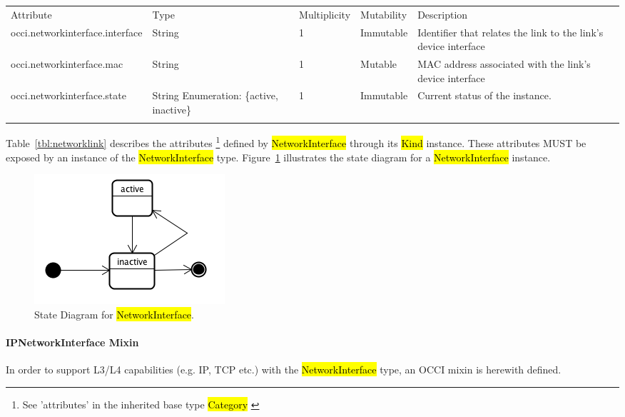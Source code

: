 \documentclass[10pt,a4paper]{article}
\begin{document}
{
	\begin{tabular}{lp{2.5cm}p{1cm}lp{6cm}}
	\toprule
	Attribute&Type&Multi\-plicity&Mutability&Description\\
	\colrule
	occi.networkinterface.interface & String & 1 & Immutable 
	& Identifier that relates the link to the link's device interface\\
	occi.networkinterface.mac & String & 1 & Mutable 
	& MAC address associated with the link's device interface\\
	occi.networkinterface.state & String Enumeration: \{active, inactive\}& 1 
	& Immutable & Current status of the instance.\\
	\botrule
	\end{tabular}
}
Table~\ref{tbl:networklink} describes the attributes \footnote{See ’attributes’ in the inherited 
base type \hl{Category}  \cite{occi:core}} 
defined by \hl{NetworkInterface} through its \hl{Kind} instance. These attributes
MUST be exposed by an instance of the \hl{NetworkInterface} type. 
Figure~\ref{fig:networklink_state} illustrates the state diagram for a \hl{NetworkInterface} instance.

\begin{figure}[!h]
	\centering
	\includegraphics[scale=0.4]{figs/infra-link-state.png}
	\caption{State Diagram for \hl{NetworkInterface}.}
	\label{fig:networklink_state}
\end{figure}

\paragraph{IPNetworkInterface Mixin}
In order to support L3/L4 capabilities (e.g. IP, TCP etc.) with the \hl{NetworkInterface} type, an 
OCCI mixin is herewith defined.
\end{document}
